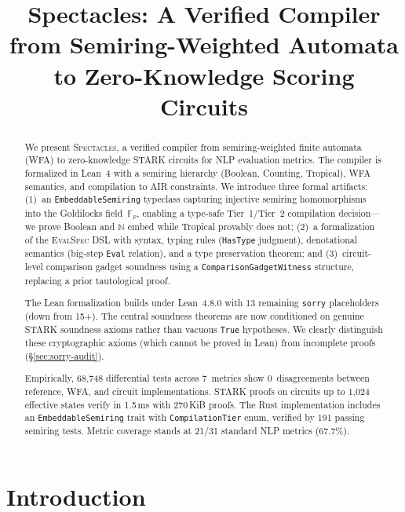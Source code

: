 \documentclass[11pt]{article}
\title{\textbf{Spectacles: A Verified Compiler from Semiring-Weighted Automata\\
  to Zero-Knowledge Scoring Circuits}}
\author{}
\date{}
\newcommand{\spectacles}{\textsc{Spectacles}}
\newcommand{\evalspec}{\textsc{EvalSpec}}
\newcommand{\N}{\mathbb{N}}
\newcommand{\F}{\mathbb{F}}
\newcommand{\sorry}{\texttt{sorry}}
\begin{document}
\maketitle

\begin{abstract}
We present \spectacles{}, a verified compiler from semiring-weighted
finite automata (WFA) to zero-knowledge STARK circuits for NLP
evaluation metrics.
The compiler is formalized in Lean~4 with a semiring hierarchy
(Boolean, Counting, Tropical), WFA semantics, and compilation to
AIR constraints.
We introduce three formal artifacts:
(1)~an \texttt{EmbeddableSemiring} typeclass capturing injective
semiring homomorphisms into the Goldilocks field~$\F_p$, enabling a
type-safe Tier~1/Tier~2 compilation decision---we prove Boolean and
$\N$ embed while Tropical provably does not;
(2)~a formalization of the \evalspec{} DSL with syntax, typing
rules (\texttt{HasType} judgment), denotational semantics (big-step
\texttt{Eval} relation), and a type preservation theorem; and
(3)~circuit-level comparison gadget soundness using a
\texttt{ComparisonGadgetWitness} structure, replacing a prior
tautological proof.

The Lean formalization builds under Lean~4.8.0 with 13 remaining
\sorry{} placeholders (down from 15+).
The central soundness theorems are now conditioned on genuine STARK
soundness axioms rather than vacuous \texttt{True} hypotheses.
We clearly distinguish these cryptographic axioms (which cannot be
proved in Lean) from incomplete proofs (\S\ref{sec:sorry-audit}).

Empirically, 68{,}748 differential tests across 7~metrics show
0~disagreements between reference, WFA, and circuit implementations.
STARK proofs on circuits up to 1{,}024 effective states verify in
1.5\,ms with 270\,KiB proofs.
The Rust implementation includes an \texttt{EmbeddableSemiring} trait
with \texttt{CompilationTier} enum, verified by 191 passing semiring
tests.
Metric coverage stands at 21/31 standard NLP metrics (67.7\%).
\end{abstract}

\section{Introduction}\label{sec:intro}
\end{document}
